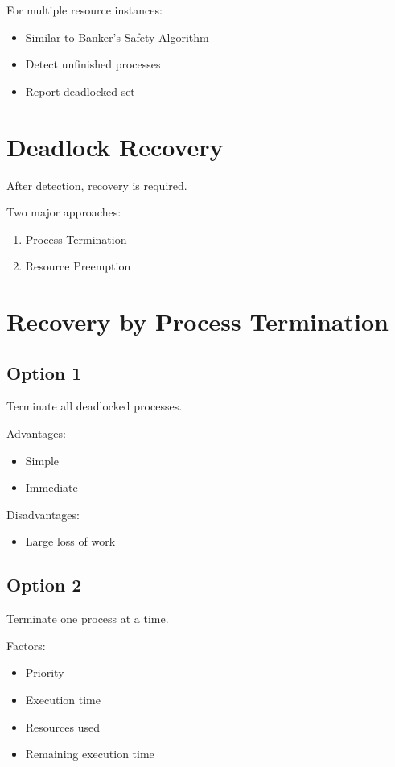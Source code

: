For multiple resource instances:

\begin{itemize}
\item Similar to Banker's Safety Algorithm
\item Detect unfinished processes
\item Report deadlocked set
\end{itemize}

\section{Deadlock Recovery}

After detection, recovery is required.

Two major approaches:

\begin{enumerate}
\item Process Termination
\item Resource Preemption
\end{enumerate}

\section{Recovery by Process Termination}

\subsection{Option 1}

Terminate all deadlocked processes.

Advantages:

\begin{itemize}
\item Simple
\item Immediate
\end{itemize}

Disadvantages:

\begin{itemize}
\item Large loss of work
\end{itemize}

\subsection{Option 2}

Terminate one process at a time.

Factors:

\begin{itemize}
\item Priority
\item Execution time
\item Resources used
\item Remaining execution time
\end{itemize}


